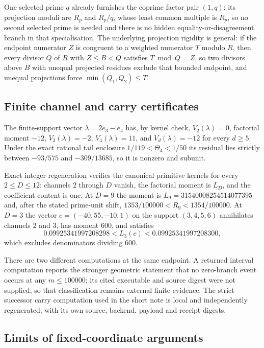 \documentclass[11pt]{article}
\newcommand{\chn}[2]{V_{#1}(#2)}
\newcommand{\Lc}{L}
\begin{document}
One selected prime $q$ already furnishes the coprime factor pair $(1,q)$: its
projection moduli are $R_p$ and $R_p/q$, whose least common multiple is
$R_p$, so no second selected prime is needed and there is no hidden
equality-or-disagreement branch in that specialisation.  The underlying
projection rigidity is general: if the endpoint numerator $Z$ is congruent to
a weighted numerator $T$ modulo $R$, then every divisor $Q$ of $R$ with
$Z\le B<Q$ satisfies $T\bmod Q=Z$, so two divisors above $B$ with unequal
projected residues exclude that bounded endpoint, and unequal projections
force $\min(Q_1,Q_2)\le T$.

\subsection{Finite channel and carry certificates}\label{long68:sec:ext-certificates}

The finite-support vector $\lambda=2e_3-e_4$ has, by kernel check,
$\chn2\lambda=0$, factorial moment $-12$, $\chn3\lambda=-2$,
$\chn4\lambda=11$, and $\chn d\lambda=-12$ for every $d\ge5$.  Under the
exact rational tail enclosure $1/119<\Theta_4<1/50$ its residual lies
strictly between $-93/575$ and $-309/13685$, so it is nonzero and subunit.

Exact integer regeneration verifies the canonical primitive kernels for every
$2\le D\le12$: channels $2$ through $D$ vanish, the factorial moment is
$\Lc_D$, and the coefficient content is one.  At $D=9$ the moment is
$\Lc_9=31540008254514077395$ and, after the stated prime-unit shift,
$1353/100000<R_9<1354/100000$.  At $D=3$ the vector $c=(-40,55,-10,1)$ on the
support $(3,4,5,6)$ annihilates channels $2$ and $3$, has moment $600$, and
satisfies
\[
 0.09925341997208298<\Lc_3(c)<0.09925341997208300 ,
\]
which excludes denominators dividing $600$.

There are two different computations at the same endpoint.  A returned
interval computation reports the stronger geometric statement that no
zero-branch event occurs at any $m\le100000$; its cited executable and source
digest were not supplied, so that classification remains external finite
evidence.  The strict-successor carry computation used in the short note is
local and independently regenerated, with its own source, backend, payload
and receipt digests.

\subsection{Limits of fixed-coordinate arguments}\label{long68:sec:ext-nogo}
\end{document}
